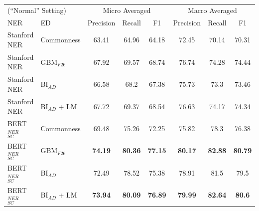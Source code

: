 \documentclass{report}
\theoremstyle{definition}
\theoremstyle{remark}
\begin{document}
\begin{table}[H]
    \centering
    \begin{tabular}{l l c c c| c c c}
    \multicolumn{2}{l}{(``Normal'' Setting)}&\multicolumn{3}{c|}{Micro Averaged}&\multicolumn{3}{c}{Macro Averaged} \\
    NER & ED &Precision&Recall&F1&Precision&Recall&F1\\
    \hline
    Stanford NER & Commonness & 63.41&64.96&64.18&72.45&70.14&	70.31\\
    Stanford NER & GBM$_{F26}$& 67.92&69.57&68.74&76.74&74.28&	74.44\\
    Stanford NER & BI$_{AD}$ &66.58&68.2&67.38&75.73&73.3&	73.46\\
    Stanford NER  & BI$_{AD}$ + LM &67.72&69.37&68.54&76.63&74.17&74.34\\
    BERT$_{SC}^{NER}$ & Commonness & 69.48&75.26&72.25&75.82&78.3&	76.38\\
    BERT$_{SC}^{NER}$ & GBM$_{F26}$ & \textcolor{ao}{\textbf{74.19}}&\textcolor{ao}{\textbf{80.36}}&\textcolor{ao}{\textbf{77.15}}&\textcolor{ao}{\textbf{80.17}}&\textcolor{ao}{\textbf{82.88}}&\textcolor{ao}{	\textbf{80.79}}\\
    BERT$_{SC}^{NER}$ & BI$_{AD}$ &72.49&78.52&75.38&78.91&81.5&	79.5\\
    BERT$_{SC}^{NER}$ & BI$_{AD}$ + LM & \textbf{73.94}&	\textbf{80.09}&	\textbf{76.89}&	\textbf{79.99}&	\textbf{82.64}&	\textbf{80.6}\\
    \end{tabular}
    

\end{table}
\end{document}
